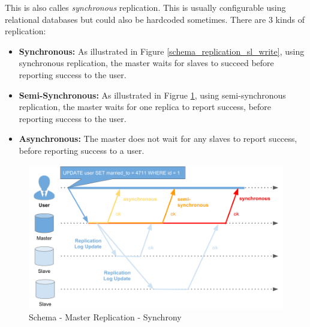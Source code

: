 {This is also calles \textit{synchronous} replication. This is usually configurable using relational databases but could also be hardcoded sometimes. There are 3 kinds of replication:\\
\begin{itemize}
\item \textbf{Synchronous:} As illustrated in Figure \ref{schema_replication_sl_write}, using synchronous replication, the master waits for slaves to succeed before reporting success to the user.
\item \textbf{Semi-Synchronous:} As illustrated in Figrue \ref{schema_replication_sl_synchronous}, using semi-synchronous replication, the master waits for one replica to report success, before reporting success to the user.
\item \textbf{Asynchronous:} The master does not wait for any slaves to report success, before reporting success to a user.\\
\end{itemize}

\begin{figure}[H]
	\centering
  \includegraphics[width=1\textwidth]{replication_schema_sl_synchronous.png}
	\caption{Schema - Master Replication - Synchrony}
	\label{schema_replication_sl_synchronous}
\end{figure}

}

